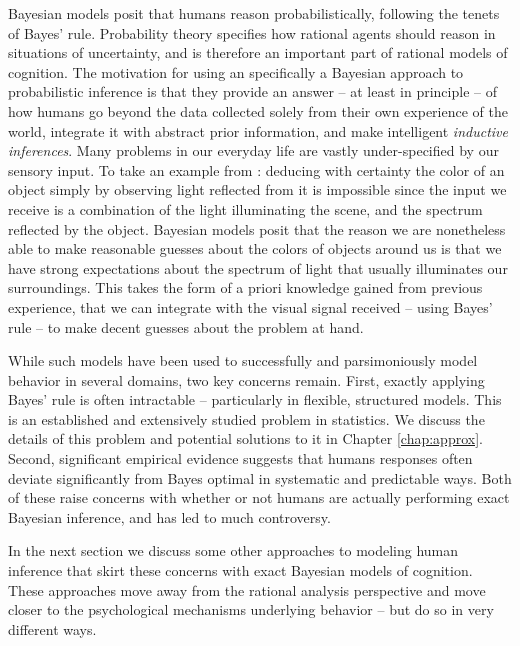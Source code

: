 Bayesian models posit that humans reason probabilistically, following the tenets of Bayes' rule. Probability theory specifies how rational agents should reason in situations of uncertainty\cite{hacking2006emergence, gigerenzer1990empire}, and is therefore an important part of rational models of cognition. The motivation for using an specifically a Bayesian approach to probabilistic inference is that they provide an answer -- at least in principle -- of how humans go beyond the data collected solely from their own experience of the world, integrate it with abstract prior information, and make intelligent \textit{inductive inferences}. Many problems in our everyday life are vastly under-specified by our sensory input. To take an example from \citet{griffiths2008bayesian}: deducing with certainty the color of an object simply by observing light reflected from it is impossible since the input we receive is a combination of the light illuminating the scene, and the spectrum reflected by the object. Bayesian models posit that the reason we are nonetheless able to make reasonable guesses about the colors of objects around us is that we have strong expectations about the spectrum of light that usually illuminates our surroundings. This takes the form of a priori knowledge gained from previous experience, that we can integrate with the visual signal received -- using Bayes' rule -- to make decent guesses about the problem at hand.

While such models have been used to successfully and parsimoniously model behavior in several domains, two key concerns remain. First, exactly applying Bayes' rule is often intractable -- particularly in flexible, structured models. This is an established and extensively studied problem in statistics. We discuss the details of this problem and potential solutions to it in Chapter \ref{chap:approx}. Second, significant empirical evidence suggests that humans responses often deviate significantly from Bayes optimal in systematic and predictable ways. \citep{tversky1974judgment, slovic1971comparison, grether1980bayes, fischhoff1983hypothesis} Both of these raise concerns with whether or not humans are actually performing exact Bayesian inference, and has led to much controversy. \citep{mellers2001frequency, gigerenzer1996narrow, samuels2012ending} 

In the next section we discuss some other approaches to modeling human inference that skirt these concerns with exact Bayesian models of cognition. These approaches move away from the rational analysis perspective and move closer to the psychological mechanisms underlying behavior -- but do so in very different ways.

